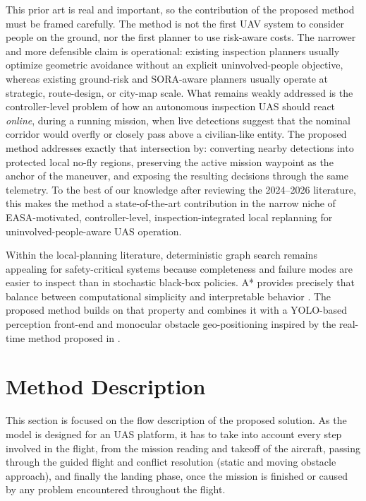 \documentclass[journal,twoside,web]{ieeecolor}
\begin{document}
This prior art is real and important, so the contribution of the proposed method must be framed carefully. The method is not the first UAV system to consider people on the ground, nor the first planner to use risk-aware costs. The narrower and more defensible claim is operational: existing inspection planners usually optimize geometric avoidance without an explicit uninvolved-people objective, whereas existing ground-risk and SORA-aware planners usually operate at strategic, route-design, or city-map scale. What remains weakly addressed is the controller-level problem of how an autonomous inspection UAS should react \emph{online}, during a running mission, when live detections suggest that the nominal corridor would overfly or closely pass above a civilian-like entity. The proposed method addresses exactly that intersection by: converting nearby detections into protected local no-fly regions, preserving the active mission waypoint as the anchor of the maneuver, and exposing the resulting decisions through the same telemetry. To the best of our knowledge after reviewing the 2024--2026 literature, this makes the method a state-of-the-art contribution in the narrow niche of EASA-motivated, controller-level, inspection-integrated local replanning for uninvolved-people-aware UAS operation.

Within the local-planning literature, deterministic graph search remains appealing for safety-critical systems because completeness and failure modes are easier to inspect than in stochastic black-box policies. A* provides precisely that balance between computational simplicity and interpretable behavior \cite{hart1968formal}. The proposed method builds on that property and combines it with a YOLO-based perception front-end \cite{ultralytics_yolo} and monocular obstacle geo-positioning inspired by the real-time method proposed in \cite{alaez2023real}.


\section{Method Description}

This section is focused on the flow description of the proposed solution. As the model is designed for an UAS platform, it has to take into account every step involved in the flight, from the mission reading and takeoff of the aircraft, passing through the guided flight and conflict resolution (static and moving obstacle approach), and finally the landing phase, once the mission is finished or caused by any problem encountered throughout the flight. 
\end{document}
